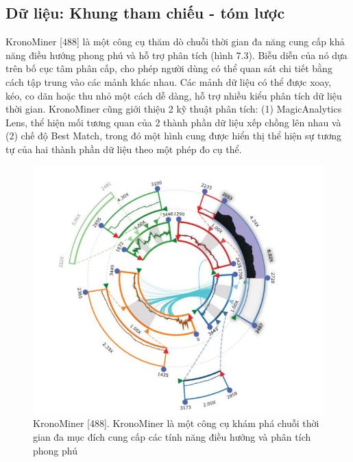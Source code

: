 \subsection{Dữ liệu: Khung tham chiếu - tóm lược}
KronoMiner [488] là một công cụ thăm dò chuỗi thời gian đa năng cung cấp khả năng điều hướng phong phú và hỗ trợ phân tích (hình 7.3). Biễu diễn của nó dựa trên bố cục tâm phân cấp, cho phép người dùng có thể  quan sát chi tiết bằng cách tập trung vào các mảnh khác nhau. Các mảnh dữ liệu có thể được xoay, kéo, co dãn hoặc thu nhỏ một cách dễ dàng, hỗ trợ nhiều kiểu phân tích dữ liệu thời gian. KronoMiner cũng giới thiệu 2 kỹ thuật phân tích: (1) MagicAnalytics Lens, thể hiện mối tương quan của 2 thành phần dữ liệu xếp chồng lên nhau và (2) chế độ Best Match, trong đó một hình cung được hiển thị thể hiện sự tương tự của hai thành phần dữ liệu theo một phép đo cụ thể. 
\begin{figure}[H] %
    \centering %
    \includegraphics[width=1\textwidth]{assets/fig_7_3.png} 
    \caption{KronoMiner [488]. KronoMiner là một công cụ khám phá chuỗi thời gian đa mục đích cung cấp các tính năng điều hướng và phân tích phong phú} %
    \label{fig:f7.3}
\end{figure}